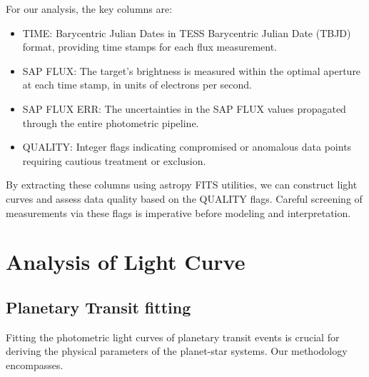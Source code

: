 \documentclass{article}
\begin{document}
For our analysis, the key columns are:

\begin{itemize}

    \item TIME: Barycentric Julian Dates in TESS Barycentric Julian Date (TBJD) format, providing time stamps for each flux measurement.

    \item SAP FLUX: The target's brightness is measured within the optimal aperture at each time stamp, in units of electrons per second.

    \item SAP FLUX ERR: The uncertainties in the SAP FLUX values propagated through the entire photometric pipeline.

    \item QUALITY: Integer flags indicating compromised or anomalous data points requiring cautious treatment or exclusion.
    
\end{itemize}

By extracting these columns using astropy FITS utilities, we can construct light curves and assess data quality based on the QUALITY flags. Careful screening of measurements via these flags is imperative before modeling and interpretation.

\section{Analysis of Light Curve}

\subsection{Planetary Transit fitting}

Fitting the photometric light curves of planetary transit events is crucial for deriving the physical parameters of the planet-star systems. Our methodology encompasses.
\end{document}
